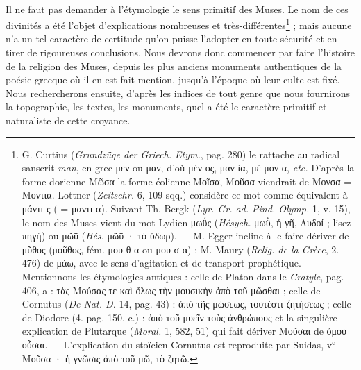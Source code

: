 \documentclass[a4paper, 11pt, oneside, polutonikogreek, french]{article}
\begin{document}
\paragraph{}
Il ne faut pas demander à l'étymologie le sens primitif des Muses. Le nom de ces divinités a été l'objet d'explications nombreuses et très-différentes\footnote{G. Curtius (\emph{Grundzüge der Griech. Etym.}, pag. 280) le rattache au radical sanscrit \emph{man}, en grec μεν ou μαν, d'où μέν-ος, μαν-ία, μέ μον α, \emph{etc.} D'après la forme dorienne Μῶσα la forme éolienne Μοῖσα, Μοῦσα viendrait de Μονσα = Μοντια. Lottner (\emph{Zeitschr.} 6, 109 sqq.) considère ce mot comme équivalent à μάντι-ς ( = μαντι-α). Suivant Th. Bergk (\emph{Lyr. Gr. ad. Pind. Olymp.} 1, v. 15), le nom des Muses vient du mot Lydien μωΰς (\emph{Hésych.} μωῢ, ἡ γῆ, Λυδοί ; lisez πηγή) ou μῶῡ (\emph{Hés.} μῶῡ · τὸ ὕδωρ). --- M. Egger incline à le faire dériver de μῦθος (μοῦθος, fém. μου-θ-α ou μου-σ-α) ; M. Maury (\emph{Relig. de la Grèce}, 2. 476) de μάω, avec le sens d'agitation et de transport prophétique.\\\hspace*{5mm}Mentionnons les étymologies antiques : celle de Platon dans le \emph{Cratyle}, pag. 406, a : τὰς Μούσας τε καὶ ὅλως τὴν μουσικὴν ἀπὸ τοῦ μῶσθαι ; celle de Cornutus (\emph{De Nat. D.} 14, pag. 43) : ἀπὸ τῆς μώσεως, τουτέστι ζητήσεως ; celle de Diodore (4. pag. 150, c.) : ἀπὸ τοῦ μυεῖν τοὺς ἀνθρώπους et la singulière explication de Plutarque (\emph{Moral.} 1, 582, 51) qui fait dériver Μοῦσαι de ὅμου οὖσαι. --- L'explication du stoïcien Cornutus est reproduite par Suidas, v° Μοῦσα · ἡ γνῶσις ἀπὸ τοῦ μῶ, τὸ ζητῶ.} ; mais aucune n'a un tel caractère de certitude qu'on puisse l'adopter en toute sécurité et en tirer de rigoureuses conclusions. Nous devrons donc commencer par faire l'histoire de la religion des Muses, depuis les plus anciens monuments authentiques de la poésie grecque où il en est fait mention, jusqu'à l'époque où leur culte est fixé. Nous rechercherons ensuite, d'après les indices de tout genre que nous fournirons la topographie, les textes, les monuments, quel a été le caractère primitif et naturaliste de cette croyance.
\end{document}
